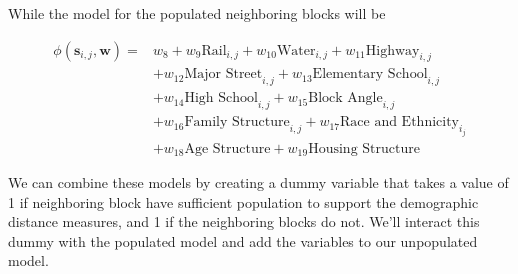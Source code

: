 \documentclass[12pt,letter]{article}\usepackage[]{graphicx}\usepackage[]{color}
\begin{document}
While the model for the populated neighboring blocks will be

\begin{align}
\phi(\mathbf{s}_{i,j}, \mathbf{w}) = & w_8 
                                     + w_9\text{Rail}_{i,j} 
                                     + w_{10}\text{Water}_{i,j} 
                                     + w_{11}\text{Highway}_{i,j}\\
                                     &+ w_{12}\text{Major Street}_{i,j} 
                                     + w_{13}\text{Elementary School}_{i,j}\\
                                     &+ w_{14}\text{High School}_{i,j} 
                                     + w_{15}\text{Block Angle}_{i,j}\\
                                     &+ w_{16}\text{Family Structure}_{i,j}
                                     + w_{17}\text{Race and Ethnicity}_{i_j}\\
                                     &+ w_{18}\text{Age Structure}  
                                     + w_{19}\text{Housing Structure}
\end{align}

We can combine these models by creating a dummy variable that takes a
value of 1 if neighboring block have sufficient population to support
the demographic distance measures, and 1 if the neighboring blocks do
not. We'll interact this dummy with the populated model and add the
variables to our unpopulated model.
\end{document}
